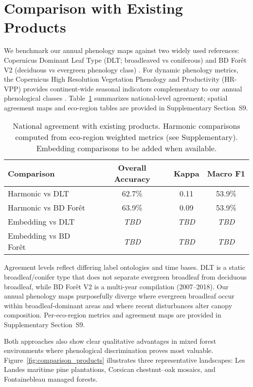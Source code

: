 \documentclass[utf8]{FrontiersinHarvard}
\begin{document}
\section{Comparison with Existing Products}

We benchmark our annual phenology maps against two widely used references: Copernicus Dominant Leaf Type (DLT; broadleaved vs coniferous) \citep{EU2024a} and BD Forêt V2 (deciduous vs evergreen phenology class) \citep{IGN2024}. For dynamic phenology metrics, the Copernicus High Resolution Vegetation Phenology and Productivity (HR-VPP) provides continent-wide seasonal indicators complementary to our annual phenological classes \citep{EU2024b}. Table~\ref{tab:product_comparison_national} summarizes national-level agreement; spatial agreement maps and eco-region tables are provided in Supplementary Section~S9.

\begin{table}[H]
    \centering
    \caption{National agreement with existing products. Harmonic comparisons computed from eco-region weighted metrics (see Supplementary). Embedding comparisons to be added when available.}
    \begin{tabular}{lccc}
        \hline
        \textbf{Comparison} & \textbf{Overall Accuracy} & \textbf{Kappa} & \textbf{Macro F1} \\
        \hline
        Harmonic vs DLT & 62.7\% & 0.11 & 53.9\% \\
        Harmonic vs BD Forêt & 63.9\% & 0.09 & 53.9\% \\
        Embedding vs DLT & \textit{TBD} & \textit{TBD} & \textit{TBD} \\
        Embedding vs BD Forêt & \textit{TBD} & \textit{TBD} & \textit{TBD} \\
        \hline
    \end{tabular}
    \label{tab:product_comparison_national}
\end{table}

Agreement levels reflect differing label ontologies and time bases. DLT is a static broadleaf/conifer type that does not separate evergreen broadleaf from deciduous broadleaf, while BD Forêt V2 is a multi-year compilation (2007–2018). Our annual phenology maps purposefully diverge where evergreen broadleaf occur within broadleaf-dominant areas and where recent disturbances alter canopy composition. Per-eco-region metrics and agreement maps are provided in Supplementary Section~S9.

Both approaches also show clear qualitative advantages in mixed forest environments where phenological discrimination proves most valuable. Figure~\ref{fig:comparison_products} illustrates three representative landscapes: Les Landes maritime pine plantations, Corsican chestnut–oak mosaics, and Fontainebleau managed forests.
\end{document}
